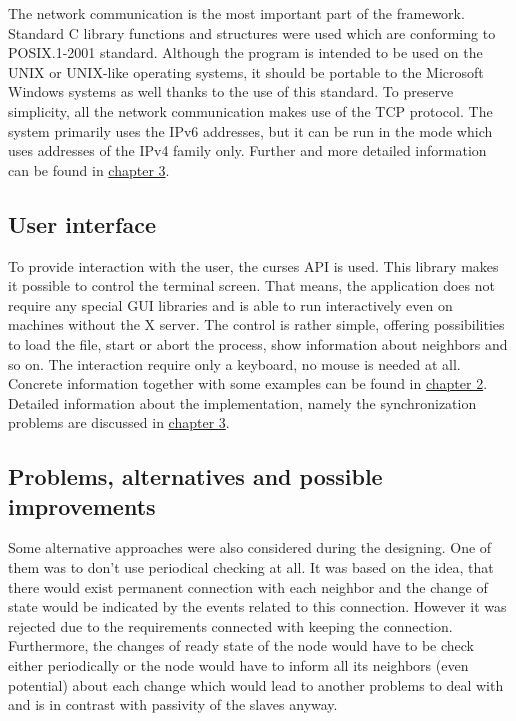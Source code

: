 The network communication is the most important part of the framework.
Standard C library functions and structures were used which are
conforming to POSIX.1-2001 standard. Although the program is intended to
be used on the UNIX or UNIX-like operating systems, it should be
portable to the Microsoft Windows systems as well thanks to the use of
this standard. To preserve simplicity, all the network communication
makes use of the TCP protocol. The system primarily uses the IPv6
addresses, but it can be run in the mode which uses addresses of the
IPv4 family only. Further and more detailed information can be found in
\hyperref[implementation]{chapter 3}.

\subsection{User interface}\label{user-interface}

To provide interaction with the user, the curses API is used. This
library makes it possible to control the terminal screen. That means,
the application does not require any special GUI libraries and is able
to run interactively even on machines without the X server. The control
is rather simple, offering possibilities to load the file, start or
abort the process, show information about neighbors and so on. The
interaction require only a keyboard, no mouse is needed at all. Concrete
information together with some examples can be found in
\hyperref[installation-and-use]{chapter 2}. Detailed information about
the implementation, namely the synchronization problems are discussed in
\hyperref[implementation]{chapter 3}.

\subsection{Problems, alternatives and possible
improvements}\label{problems-alternatives-and-possible-improvements}

Some alternative approaches were also considered during the designing.
One of them was to don't use periodical checking at all. It was based on
the idea, that there would exist permanent connection with each neighbor
and the change of state would be indicated by the events related to this
connection. However it was rejected due to the requirements connected
with keeping the connection. Furthermore, the changes of ready state of
the node would have to be check either periodically or the node would
have to inform all its neighbors (even potential) about each change
which would lead to another problems to deal with and is in contrast
with passivity of the slaves anyway.

